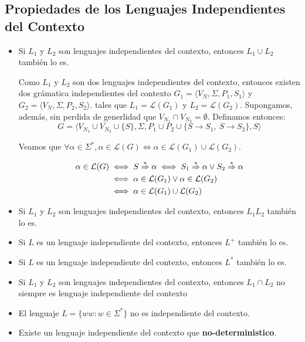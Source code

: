 \subsection{Propiedades de los Lenguajes Independientes del Contexto}
\begin{itemize}
  \item Si \(L_1\) y \(L_2\) son lenguajes independientes del contexto, entonces \(L_1 \cup L_2\) también lo es.
        \begin{demo}[0.8\textwidth]
          Como \(L_1\) y \(L_2\) son dos lenguajes independientes del contexto, entonces existen dos grámatica independientes del contexto \(G_1=\langle V_N, \Sigma, P_1, S_1 \rangle\) y \(G_2=\langle V_N, \Sigma, P_2, S_2 \rangle\). tales que \(L_1 = \mathcal{L}(G_1)\) y \(L_2 = \mathcal{L}(G_2)\). Supongamos, además, sin perdida de generlidad que \(V_{N_1}\cap V_{N_2} = \emptyset\). Definamos entonces:
          \[ G = \langle V_{N_1} \cup V_{N_2} \cup \{S\}, \Sigma, P_1 \cup P_2 \cup \{ S \to S_1,~S\to S_2\}, S \rangle \]

          Veamos que \(\forall\alpha\in\Sigma^*, \alpha\in\mathcal{L}(G) \iff \alpha\in\mathcal{L}(G_1) \cup \mathcal{L}(G_2)\).

          \begin{align*}
            \alpha\in\mathcal{L}(G) & \iff S\overset{*}{\Rightarrow}\alpha \iff S_1 \overset{*}{\Rightarrow} \alpha \lor S_2\overset{*}{\Rightarrow} \alpha \\
                                    & \iff \alpha\in\mathcal{L}(G_1) \lor \alpha\in\mathcal{L}(G_2)      \\
                                    & \iff \alpha\in\mathcal{L}(G_1) \cup \mathcal{L}(G_2)
          \end{align*}
        \end{demo}
  \item Si \(L_1\) y \(L_2\) son lenguajes independientes del contexto, entonces \(L_1L_2\) también lo es.
        \begin{demo}

        \end{demo}
  \item Si \(L\) es un lenguaje independiente del contexto, entonces \(L^+\) también lo es. 
  \item  Si \(L\) es un lenguaje independiente del contexto, entonces \(L^*\) también lo es. 
  \item Si \(L_1\) y \(L_2\) son lenguajes independientes del contexto, entonces \(L_1\cap L_2\) no siempre es lenguaje independiente del contexto 
  \item El lenguaje \(L = \{ ww : w \in \Sigma^* \}\) no es independiente del contexto. 
  \item Existe un lenguaje independiente del contexto que \textbf{no-deterministico}. 
\end{itemize}


